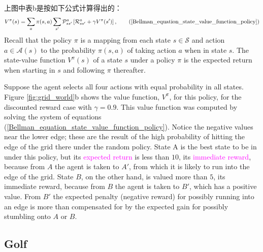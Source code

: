 \begin{emp_box}
上图中表b是按如下公式计算得出的：
\begin{align} 
V^\pi(s)=\sum_{a}\pi(s,a)\sum_{s'}\mathcal{P}_{ss'}^a\left[ \mathcal{R}_{ss'}^a + 
\gamma V^\pi(s')\right], \tag{\ref{Bellman_equation_state_value_function_policy}}
\end{align}
Recall that the policy $\pi$ is a mapping from each state $s\in\mathcal{S}$ and 
action $a\in\mathcal{A}(s)$ to the probability $\pi(s,a)$ of taking action $a$ 
when in state $s$. The state-value function $V^\pi(s)$ of a state $s$ under a 
policy $\pi$ is the expected return when starting in $s$ and following $\pi$ thereafter.
\end{emp_box}

Suppose the agent selects all four actions with equal probability in all states. Figure 
\ref{fig:grid_world}b shows the value function, $V^\pi$, for this policy, for the 
discounted reward case with $\gamma=0.9$. This value function was computed by solving 
the system of equations (\ref{Bellman_equation_state_value_function_policy}). Notice the 
negative values near the lower edge; these are the result of the high probability of 
hitting the edge of the grid there under the random policy. State A is the best state to 
be in under this policy, but its \textcolor{magenta}{expected return} is less than $10$, its 
\textcolor{magenta}{immediate reward}, 
because from $A$ the agent is taken to $A'$, from which it is likely to run into the edge 
of the grid. State $B$, on the other hand, is valued more than $5$, its immediate reward, 
because from $B$ the agent is taken to $B'$, which has a positive value. From $B'$ the 
expected penalty (negative reward) for possibly running into an edge is more than 
compensated for by the expected gain for possibly stumbling onto $A$ or $B$.


\subsection{Golf}


